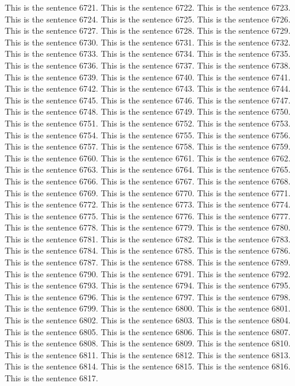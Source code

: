 \documentclass{article}
\begin{document}
This is the sentence 6721.
This is the sentence 6722.
This is the sentence 6723.
This is the sentence 6724.
This is the sentence 6725.
This is the sentence 6726.
This is the sentence 6727.
This is the sentence 6728.
This is the sentence 6729.
This is the sentence 6730.
This is the sentence 6731.
This is the sentence 6732.
This is the sentence 6733.
This is the sentence 6734.
This is the sentence 6735.
This is the sentence 6736.
This is the sentence 6737.
This is the sentence 6738.
This is the sentence 6739.
This is the sentence 6740.
This is the sentence 6741.
This is the sentence 6742.
This is the sentence 6743.
This is the sentence 6744.
This is the sentence 6745.
This is the sentence 6746.
This is the sentence 6747.
This is the sentence 6748.
This is the sentence 6749.
This is the sentence 6750.
This is the sentence 6751.
This is the sentence 6752.
This is the sentence 6753.
This is the sentence 6754.
This is the sentence 6755.
This is the sentence 6756.
This is the sentence 6757.
This is the sentence 6758.
This is the sentence 6759.
This is the sentence 6760.
This is the sentence 6761.
This is the sentence 6762.
This is the sentence 6763.
This is the sentence 6764.
This is the sentence 6765.
This is the sentence 6766.
This is the sentence 6767.
This is the sentence 6768.
This is the sentence 6769.
This is the sentence 6770.
This is the sentence 6771.
This is the sentence 6772.
This is the sentence 6773.
This is the sentence 6774.
This is the sentence 6775.
This is the sentence 6776.
This is the sentence 6777.
This is the sentence 6778.
This is the sentence 6779.
This is the sentence 6780.
This is the sentence 6781.
This is the sentence 6782.
This is the sentence 6783.
This is the sentence 6784.
This is the sentence 6785.
This is the sentence 6786.
This is the sentence 6787.
This is the sentence 6788.
This is the sentence 6789.
This is the sentence 6790.
This is the sentence 6791.
This is the sentence 6792.
This is the sentence 6793.
This is the sentence 6794.
This is the sentence 6795.
This is the sentence 6796.
This is the sentence 6797.
This is the sentence 6798.
This is the sentence 6799.
This is the sentence 6800.
This is the sentence 6801.
This is the sentence 6802.
This is the sentence 6803.
This is the sentence 6804.
This is the sentence 6805.
This is the sentence 6806.
This is the sentence 6807.
This is the sentence 6808.
This is the sentence 6809.
This is the sentence 6810.
This is the sentence 6811.
This is the sentence 6812.
This is the sentence 6813.
This is the sentence 6814.
This is the sentence 6815.
This is the sentence 6816.
This is the sentence 6817.
\end{document}
